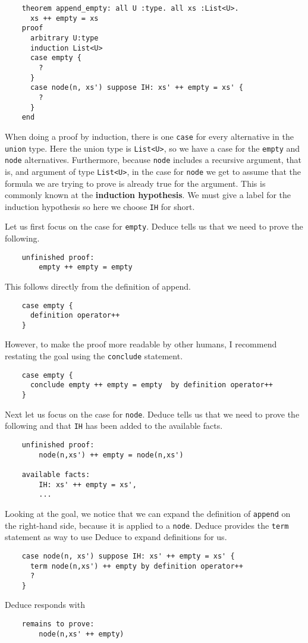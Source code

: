 \documentclass[12pt]{article}
\begin{document}
\begin{verbatim}
    theorem append_empty: all U :type. all xs :List<U>.
      xs ++ empty = xs
    proof
      arbitrary U:type
      induction List<U>
      case empty {
        ?
      }
      case node(n, xs') suppose IH: xs' ++ empty = xs' {
        ?
      }
    end
\end{verbatim}

When doing a proof by induction, there is one \texttt{case} for every
alternative in the \texttt{union} type. Here the union type is
\texttt{List<U>}, so we have a case for the \texttt{empty} and
\texttt{node} alternatives.  Furthermore, because \texttt{node}
includes a recursive argument, that is, and argument of type
\texttt{List<U>}, in the case for \texttt{node} we get to assume that
the formula we are trying to prove is already true for the
argument. This is commonly known at the \textbf{induction hypothesis}.
We must give a label for the induction hypothesis so here we choose
\texttt{IH} for short.

Let us first focus on the case for \texttt{empty}. Deduce tells us that we
need to prove the following.

\begin{verbatim}
    unfinished proof:
        empty ++ empty = empty
\end{verbatim}
This follows directly from the definition of append.
\begin{verbatim}
    case empty {
      definition operator++
    }
\end{verbatim}
However, to make the proof more readable by other humans, I recommend
restating the goal using the \texttt{conclude} statement.
\begin{verbatim}
    case empty {
      conclude empty ++ empty = empty  by definition operator++
    }
\end{verbatim}

Next let us focus on the case for \texttt{node}. Deduce tells us that
we need to prove the following and that \texttt{IH} has been added to
the available facts.
\begin{verbatim}
    unfinished proof:
        node(n,xs') ++ empty = node(n,xs')

    available facts:
        IH: xs' ++ empty = xs',
        ...
\end{verbatim}
Looking at the goal, we notice that we can expand the definition of
\texttt{append} on the right-hand side, because it is applied to a
\texttt{node}.  Deduce provides the \texttt{term} statement as way to
use Deduce to expand definitions for us.
\begin{verbatim}
    case node(n, xs') suppose IH: xs' ++ empty = xs' {
      term node(n,xs') ++ empty by definition operator++
      ?
    }
\end{verbatim}
Deduce responds with
\begin{verbatim}
    remains to prove:
        node(n,xs' ++ empty)
\end{verbatim}
\end{document}
